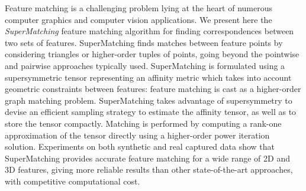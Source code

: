 Feature matching is a challenging problem lying at the heart of numerous computer graphics and computer vision applications.
We present here the \emph{SuperMatching} feature matching algorithm for finding correspondences between two sets of features.
SuperMatching finds matches between feature points by considering triangles or higher-order tuples of points, going beyond the pointwise and pairwise approaches typically used.
SuperMatching is formulated using a supersymmetric tensor representing an affinity metric which takes into account geometric constraints between features: feature matching is cast as a higher-order graph matching problem.
SuperMatching takes advantage of supersymmetry to devise an
efficient sampling strategy to estimate the affinity tensor, as well as to store the tensor compactly.
Matching is performed by computing a rank-one approximation of the tensor directly
using a higher-order power iteration solution.
Experiments on both synthetic and real captured data show that
SuperMatching provides accurate feature matching for a wide range of 2D and 3D features,
giving more reliable results than other state-of-the-art approaches, with competitive computational cost. 